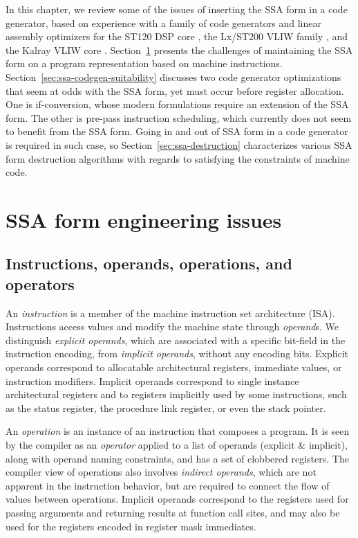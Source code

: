In this chapter, we review some of the issues of inserting the SSA form in a code
generator, based on experience with a family of code generators and linear
assembly optimizers for the ST120 DSP core \cite{Dinechin:2000:ME}
\cite{Dinechin:2000:CASES,Stoutchinin:2001:MICRO,Rastello:2004:CGO}, the
Lx/ST200 VLIW family \cite{Faraboschi:2000:ISCA}
\cite{Dinechin:2007:MISTA,Dinechin:2008:EuroPar,Boissinot:2008:CGO,Boissinot:2009:CGO,Boissinot:2011:APLAS},
and the Kalray VLIW core \cite{Dinechin:2013:HPEC}.
Section~\ref{sec:ssa-codegen-engineering} presents the challenges of maintaining
the SSA form on a program representation based on machine instructions.
Section~\ref{sec:ssa-codegen-suitability} discusses two code generator
optimizations that seem at odds with the SSA form, yet must occur before register
allocation. One is if-conversion, whose modern formulations require an extension
of the SSA form. The other is pre-pass instruction scheduling, which currently
does not seem to benefit from the SSA form.  Going in and out of SSA form in a
code generator is required in such case, so Section~\ref{sec:ssa-destruction}
characterizes various SSA form destruction algorithms with regards to satisfying
the constraints of machine code.


\section{SSA form engineering issues}
\label{sec:ssa-codegen-engineering}

\subsection{Instructions, operands, operations, and operators}

An \emph{instruction} is a member of the machine instruction set architecture
(ISA). Instructions access values and modify the machine state through
\emph{operand}s. We distinguish \emph{explicit operands}, which are associated
with a specific bit-field in the instruction encoding, from \emph{implicit
operands}, without any encoding bits.  Explicit operands correspond to
allocatable architectural registers, immediate values, or instruction modifiers.
Implicit operands correspond to single instance architectural registers and to
registers implicitly used by some instructions, such as the status register, the
procedure link register, or even the stack pointer.

An \emph{operation} is an instance of an instruction that composes a program. It
is seen by the compiler as an \emph{operator} applied to a list of operands
(explicit \& implicit), along with operand naming constraints, and has a set of
clobbered registers. The compiler view of operations also involves
\emph{indirect operands}, which are not apparent in the instruction behavior,
but are required to connect the flow of values between operations.  Implicit
operands correspond to the registers used for passing arguments and returning
results at function call sites, and may also be used for the registers
encoded in register mask immediates.

